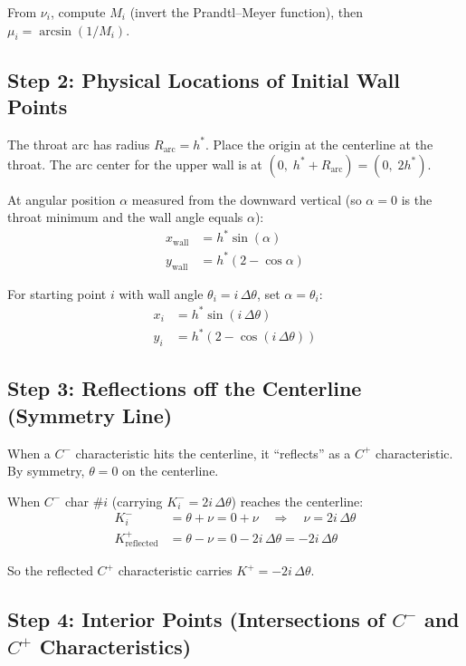 \documentclass[11pt]{article}
\begin{document}
From $\nu_i$, compute $M_i$ (invert the Prandtl--Meyer function), then $\mu_i = \arcsin(1/M_i)$.

\subsection{Step 2: Physical Locations of Initial Wall Points}

The throat arc has radius $R_{\mathrm{arc}} = h^*$. Place the origin at the centerline at the throat. The arc center for the upper wall is at $(0,\; h^* + R_{\mathrm{arc}}) = (0,\; 2h^*)$.

At angular position $\alpha$ measured from the downward vertical (so $\alpha = 0$ is the throat minimum and the wall angle equals $\alpha$):
\begin{align}
    x_{\mathrm{wall}} &= h^* \sin(\alpha) \\
    y_{\mathrm{wall}} &= h^*(2 - \cos\alpha)
\end{align}

For starting point $i$ with wall angle $\theta_i = i\,\Delta\theta$, set $\alpha = \theta_i$:
\begin{align}
    x_i &= h^* \sin(i\,\Delta\theta) \\
    y_i &= h^*(2 - \cos(i\,\Delta\theta))
\end{align}

\subsection{Step 3: Reflections off the Centerline (Symmetry Line)}

When a $C^-$ characteristic hits the centerline, it ``reflects'' as a $C^+$ characteristic. By symmetry, $\theta = 0$ on the centerline.

When $C^-$ char \#$i$ (carrying $K^-_i = 2i\,\Delta\theta$) reaches the centerline:
\begin{align}
    K^-_i &= \theta + \nu = 0 + \nu \quad \Longrightarrow \quad \nu = 2i\,\Delta\theta \\
    K^+_{\mathrm{reflected}} &= \theta - \nu = 0 - 2i\,\Delta\theta = -2i\,\Delta\theta
\end{align}

So the reflected $C^+$ characteristic carries $K^+ = -2i\,\Delta\theta$.

\subsection{Step 4: Interior Points (Intersections of $C^-$ and $C^+$ Characteristics)}
\end{document}
